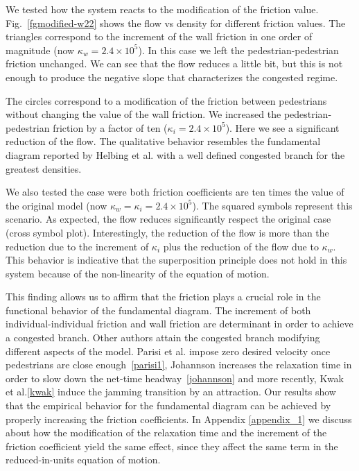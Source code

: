 We tested how the system reacts to the modification of the friction value. Fig.~\ref{fgmodified-w22} shows the flow vs density for different friction values. The triangles correspond to the increment of the wall friction in one order of magnitude (now $\kappa_w = 2.4\times10^{5}$). In this case we left the pedestrian-pedestrian friction unchanged. We can see that the flow reduces a little bit, but this is not enough to produce the negative slope that characterizes the congested regime. 

The circles correspond to a modification of the friction between pedestrians without changing the value of the wall friction. We increased the pedestrian-pedestrian friction by a factor of ten ($\kappa_i = 2.4\times10^{5}$). Here we see a significant reduction of the flow. The qualitative behavior resembles the fundamental diagram reported by Helbing et al. with a well defined congested branch for the greatest densities.

We also tested the case were both friction coefficients are ten times the value of the original model (now $\kappa_w = \kappa_i = 2.4\times10^{5}$). The squared symbols represent this scenario. As expected, the flow reduces significantly respect the original case (cross symbol plot). Interestingly, the reduction of the flow is more than the reduction due to the increment of $\kappa_i$ plus the reduction of the flow due to $\kappa_w$. This behavior is indicative that the superposition principle does not hold in this system because of the non-linearity of the equation of motion.   

This finding allows us to affirm that the friction plays a crucial role in the functional behavior of the fundamental diagram. The increment of both individual-individual friction and wall friction are determinant in order to achieve a congested branch. Other authors attain the congested branch modifying different aspects of the model. Parisi et al. impose zero desired velocity once pedestrians are close enough~\ref{parisi1}, Johannson increases the relaxation time in order to slow down the net-time headway~\ref{johannson} and more recently, Kwak et al.\ref{kwak} induce the jamming transition by an attraction. Our results show that the empirical behavior for the fundamental diagram can be achieved by properly increasing the friction coefficients. In Appendix \ref{appendix_1} we discuss about how the modification of the relaxation time and the increment of the friction coefficient yield the same effect, since they affect the same term in the reduced-in-units equation of motion.  


